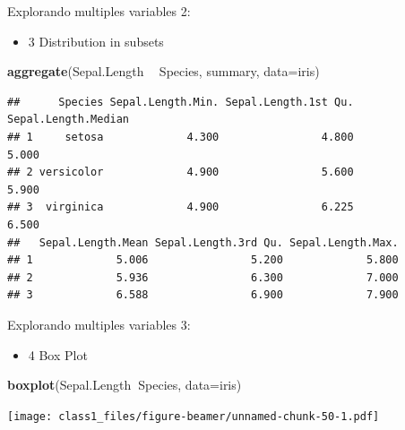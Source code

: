 \documentclass[ignorenonframetext,]{beamer}
\newenvironment{Shaded}{\begin{snugshade}}{\end{snugshade}}
\newcommand{\KeywordTok}[1]{\textcolor[rgb]{0.13,0.29,0.53}{\textbf{#1}}}
\newcommand{\DataTypeTok}[1]{\textcolor[rgb]{0.13,0.29,0.53}{#1}}
\newcommand{\StringTok}[1]{\textcolor[rgb]{0.31,0.60,0.02}{#1}}
\newcommand{\OperatorTok}[1]{\textcolor[rgb]{0.81,0.36,0.00}{\textbf{#1}}}
\newcommand{\NormalTok}[1]{#1}
\providecommand{\tightlist}{%
  \setlength{\itemsep}{0pt}\setlength{\parskip}{0pt}}
\begin{document}
\begin{frame}[fragile]{Explorando multiples variables 2:}

\begin{itemize}
\tightlist
\item
  3 Distribution in subsets
\end{itemize}

\begin{Shaded}
\begin{Highlighting}[]
\KeywordTok{aggregate}\NormalTok{(Sepal.Length }\OperatorTok{~}\StringTok{ }\NormalTok{Species, summary, }\DataTypeTok{data=}\NormalTok{iris)}
\end{Highlighting}
\end{Shaded}

\begin{verbatim}
##      Species Sepal.Length.Min. Sepal.Length.1st Qu. Sepal.Length.Median
## 1     setosa             4.300                4.800               5.000
## 2 versicolor             4.900                5.600               5.900
## 3  virginica             4.900                6.225               6.500
##   Sepal.Length.Mean Sepal.Length.3rd Qu. Sepal.Length.Max.
## 1             5.006                5.200             5.800
## 2             5.936                6.300             7.000
## 3             6.588                6.900             7.900
\end{verbatim}

\end{frame}

\begin{frame}[fragile]{Explorando multiples variables 3:}

\begin{itemize}
\tightlist
\item
  4 Box Plot
\end{itemize}

\begin{Shaded}
\begin{Highlighting}[]
\KeywordTok{boxplot}\NormalTok{(Sepal.Length}\OperatorTok{~}\NormalTok{Species, }\DataTypeTok{data=}\NormalTok{iris)}
\end{Highlighting}
\end{Shaded}

\texttt{[image: class1\_files/figure-beamer/unnamed-chunk-50-1.pdf]}

\end{frame}
\end{document}
